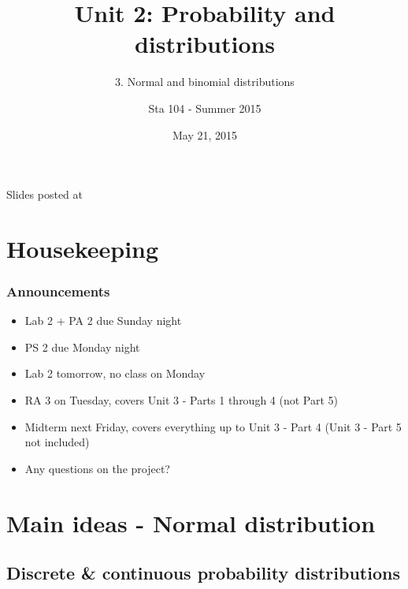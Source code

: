 \documentclass[11pt,containsverbatim,handout,xcolor=xelatex,dvipsnames,table]{beamer}
\title{Unit 2: Probability and distributions}
\subtitle{3. Normal and binomial distributions}
\author{Sta 104 - Summer 2015}
\date{May 21, 2015}
\institute{Duke University, Department of Statistical Science}
\begin{document}



\begin{frame}[plain]

\titlepage
\vfill
{\scriptsize {} \hfill Slides posted at  \webLink{\CourseSite}{\CourseSite}}
\addtocounter{framenumber}{-1} 

\end{frame}


\section{Housekeeping}


\begin{frame}
\frametitle{Announcements}

\begin{itemize}

\item Lab 2 + PA 2 due Sunday night

\item PS 2 due Monday night

\item Lab 2 tomorrow, no class on Monday

\item RA 3 on Tuesday, covers Unit 3 - Parts 1 through 4 (not Part 5)

\item Midterm next Friday, covers everything up to Unit 3 - Part 4 (Unit 3 - Part 5 not included)

\item Any questions on the project?

\end{itemize}

\end{frame}


\section{Main ideas - Normal distribution}


\subsection{Discrete \& continuous probability distributions}
\label{mi1normal}
\end{document}
